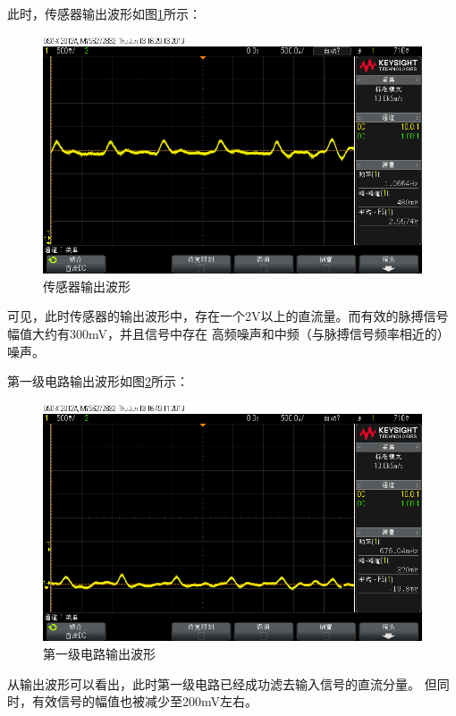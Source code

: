 \documentclass{article}
\begin{document}
\begin{spacing}{1.5}
    此时，传感器输出波形如图\ref{fig:result1}所示：
    \begin{figure}[H]
        \centering
        \includegraphics[scale=0.3]{fig/result/result1.png}
        \caption{传感器输出波形}
        \label{fig:result1}
    \end{figure}

    可见，此时传感器的输出波形中，存在一个2V以上的直流量。而有效的脉搏信号幅值大约有300mV，并且信号中存在
    高频噪声和中频（与脉搏信号频率相近的）噪声。
    
    第一级电路输出波形如图\ref{fig:result2}所示：
    \begin{figure}[H]
        \centering
        \includegraphics[scale=0.3]{fig/result/result2.png}
        \caption{第一级电路输出波形}
        \label{fig:result2}
    \end{figure}

    从输出波形可以看出，此时第一级电路已经成功滤去输入信号的直流分量。
    但同时，有效信号的幅值也被减少至200mV左右。


\end{spacing}
\end{document}
